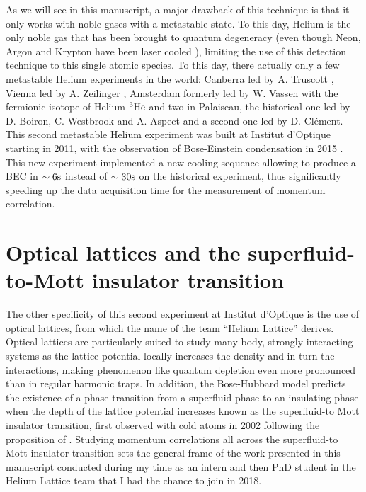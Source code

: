 As we will see in this manuscript, a major drawback of this technique is that it only works with noble gases with a metastable state. To this day, Helium is the only noble gas that has been brought to quantum degeneracy (even though Neon, Argon and Krypton have been laser cooled \cite{katori1990laser,shimizu1989laser}), limiting the use of this detection technique to this single atomic species. To this day, there actually only a few metastable Helium experiments in the world: Canberra led by A. Truscott \cite{abbas2021rapid}, Vienna led by A. Zeilinger \cite{keller2014bose}, Amsterdam formerly led by W. Vassen \cite{mcnamara2006degenerate} with the fermionic isotope of Helium $^3 \rm{He}$ and two in Palaiseau, the historical one led by D. Boiron, C. Westbrook and A. Aspect and a second one led by D. Clément. This second metastable Helium experiment was built at Institut d'Optique starting in 2011, with the observation of Bose-Einstein condensation in 2015 \cite{bouton2015fast}. This new experiment implemented a new cooling sequence allowing to produce a BEC in $\sim 6\rm{s}$ instead of $\sim 30\rm{s}$ on the historical experiment, thus significantly speeding up the data acquisition time for the measurement of momentum correlation.

\section*{Optical lattices and the superfluid-to-Mott insulator transition}

The other specificity of this second experiment at Institut d'Optique is the use of optical lattices, from which the name of the team ``Helium Lattice'' derives. Optical lattices are particularly suited to study many-body, strongly interacting systems as the lattice potential locally increases the density and in turn the interactions, making phenomenon like quantum depletion even more pronounced than in regular harmonic traps. In addition, the Bose-Hubbard model predicts the existence of a phase transition from a superfluid phase to an insulating phase when the depth of the lattice potential increases known as the superfluid-to Mott insulator transition, first observed with cold atoms in 2002 \cite{greiner2002quantum} following the proposition of \cite{jaksch1998cold}. Studying momentum correlations all across the superfluid-to Mott insulator transition sets the general frame of the work presented in this manuscript conducted during my time as an intern and then PhD student in the Helium Lattice team that I had the chance to join in 2018.

